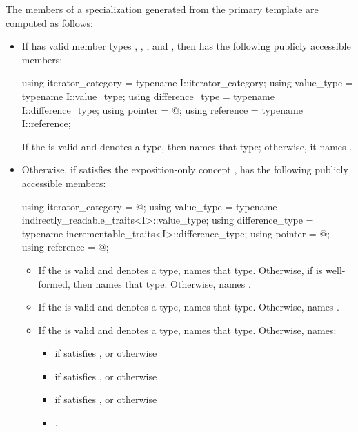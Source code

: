 \pnum
The members of a specialization  generated from the
 primary template are computed as follows:

\begin{itemize}
\item
If  has valid member
types , ,
, and ,
then
has the following publicly accessible members:
\begin{codeblock}
using iterator_category = typename I::iterator_category;
using value_type        = typename I::value_type;
using difference_type   = typename I::difference_type;
using pointer           = @\seebelow@;
using reference         = typename I::reference;
\end{codeblock}
If the   is valid and
denotes a type, then  names that type;
otherwise, it names .

\item
Otherwise, if  satisfies the exposition-only concept
,
 has the following
publicly accessible members:
\begin{codeblock}
using iterator_category = @\seebelow@;
using value_type        = typename indirectly_readable_traits<I>::value_type;
using difference_type   = typename incrementable_traits<I>::difference_type;
using pointer           = @\seebelow@;
using reference         = @\seebelow@;
\end{codeblock}
\begin{itemize}
\item If the   is valid and denotes a type,
 names that type. Otherwise, if
 is well-formed, then
 names that type. Otherwise, 
names .

\item If the   is valid and denotes a
type,  names that type. Otherwise, 
names .

\item If the   is valid and
denotes a type,  names that type.
Otherwise,  names:
\begin{itemize}
\item
{}
if
 satisfies ,
or otherwise
\item
{} if
 satisfies ,
or otherwise
\item
{} if
 satisfies ,
or otherwise
\item
{}.
\end{itemize}
\end{itemize}


\end{itemize}
